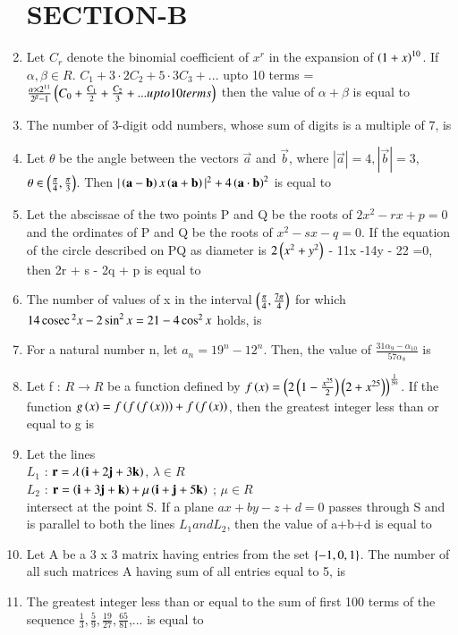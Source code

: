 \documentclass[journal]{IEEEtran}
\numberwithin{equation}{enumi}
\numberwithin{figure}{enumi}
\begin{document}
\begin{enumerate}
\section{SECTION-B}
\item Let $C_r$ denote the binomial coefficient of $x^r$ in the expansion of $\left(1 + x\right)^{10}$. If $\alpha, \beta \in R$. $C_1 + 3\cdot2C_2 + 5\cdot3C_3 + ...$ upto 10 terms = $\frac{\alpha\times2^{11}}{2^{\beta} - 1}\left(C_0 +\frac{C_1}{2} + \frac{C_2}{3} + ...upto 10 terms\right)$ then the value of $\alpha + \beta$ is equal to
\item The number of 3-digit odd numbers, whose sum of digits is a multiple of 7, is
\item Let $\theta$ be the angle between the vectors $\vec{a}$ and $\vec{b}$, where $|\vec{a}|=4,|\vec{b}|=3$, $\theta \in \left(\frac{\pi}{4},\frac{\pi}{3}\right)$. Then $|\left(\mathbf{a}-\mathbf{b}\right) x \left(\mathbf{a}+\mathbf{b}\right)|^2 + 4\left(\mathbf{a}\cdot\mathbf{b}\right)^2$ is equal to
\item Let the abscissae of the two points P and Q be the roots of $2x^2 - rx + p = 0$ and the ordinates of P and Q be the roots of $x^2-sx-q = 0$. If the equation of the circle described on PQ as diameter is $2\left(x^2 + y^2\right)$ - 11x -14y - 22 =0, then 2r + s - 2q + p is equal to
\item The number of values of x in the interval $\left(\frac{\pi}{4},\frac{7\pi}{4}\right)$ for which $14\,\text{cosec}\,^2x - 2\sin^2x = 21 - 4\cos^2x$ holds, is
\item For a natural number n, let $a_n = 19^n - 12^n$. Then, the value of $\frac{31\alpha_9 -\alpha_10}{57\alpha_8}$ is
\item Let f : $R \rightarrow R$ be a function defined by $f\left(x\right) = \left(2\left(1-\frac{x^{25}}{2}\right)\left(2+x^{25}\right)\right)^{\frac{1}{50}}$. If the function $g\left(x\right) = f\left(f\left(f\left(x\right)\right)\right) + f\left(f\left(x\right)\right)$, then the greatest integer less than or equal to g is
\item Let the lines \\
	$L_1$ : $\mathbf{r} = \lambda\left(\mathbf{i}+2\mathbf{j}+3\mathbf{k}\right)$, $\lambda \in R$ \\
	$L_2$ : $\mathbf{r} = \left(\mathbf{i} + 3\mathbf{j} + \mathbf{k}\right) + \mu\left(\mathbf{i} + \mathbf{j} +5\mathbf{k}\right)$ ; $\mu \in R$ \\
	intersect at the point S. If a plane $ax+by-z+d=0$ passes through S and is parallel to both the lines $L_1 andL_2$, then the value of a+b+d is equal to
\item Let A be a 3 x 3 matrix having entries from the set $\left\{-1,0,1\right\}$. The number of all such matrices A having sum of all entries equal to 5, is
\item The greatest integer less than or equal to the sum of first 100 terms of the sequence $\frac{1}{3},\frac{5}{9},\frac{19}{27},\frac{65}{81}$,... is equal to

\end{enumerate}
\end{document}
